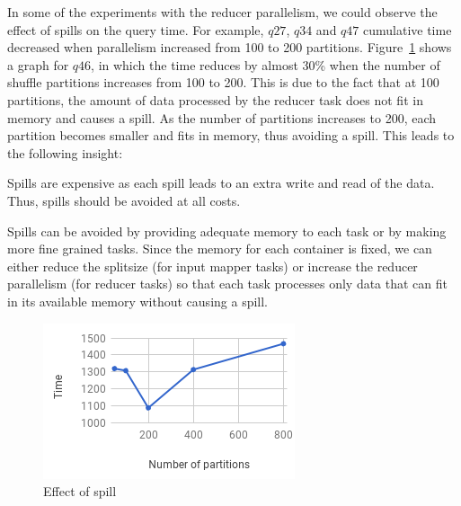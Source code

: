 In some of the experiments with the reducer parallelism, we could observe the effect of spills on the query time. For example, $q27$, $q34$ and $q47$ cumulative time decreased when parallelism increased from 100 to 200 partitions. Figure~\ref{fig:q46} shows a graph for $q46$, in which the time reduces by almost 30\% when the number of shuffle partitions increases from 100 to 200. This is due to the fact that at 100 partitions, the amount of data processed by the reducer task does not fit in memory and causes a spill. As the number of partitions increases to 200, each partition becomes smaller and fits in memory, thus avoiding a spill. This leads to the following insight:
\begin{insight}
	\label{insight:spill}
	Spills are expensive as each spill leads to an extra write and read of the data. Thus, spills should be avoided at all costs.
\end{insight}
Spills can be avoided by providing adequate memory to each task or by making more fine grained tasks. Since the memory for each container is fixed, we can either reduce the splitsize (for input mapper tasks) or increase the reducer parallelism (for reducer tasks) so that each task processes only data that can fit in its available memory without causing a spill.

\begin{figure}[h]
	\includegraphics[width=\linewidth]{fig/q46.png}
	\caption{Effect of spill}
	\label{fig:q46}
\end{figure}


